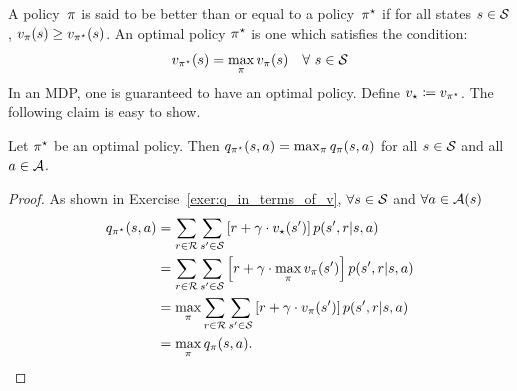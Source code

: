 A policy~$\pi$ is said to be better than or equal to a policy~$\pi^{\star}$
if for all states $s \in \mathcal{S}$, $v_{\pi}(s) \geq v_{\pi^{\star}}(s)$. 
An optimal policy $\pi^{\star}$ is one which satisfies the condition:
\begin{equation}
    v_{\pi^{\star}} (s) = \max_{\pi} v_{\pi} (s) \quad \forall \ s \in \mathcal{S}
\end{equation}
In an MDP, one is guaranteed to have an optimal policy. Define 
$v_{\star} \coloneqq v_{\pi^{\star}}$. The following claim is easy to show.
\begin{lemma}
Let $\pi^{\star}$ be an optimal policy. Then 
$q_{\pi^{\star}}(s, a) = \max_{\pi} q_{\pi} (s, a)$ for all $s \in \mathcal{S}$
and all $a \in \mathcal{A}$.
\end{lemma} 
\begin{proof}
As shown in Exercise~\ref{exer:q_in_terms_of_v}, $\forall s \in \mathcal{S}$ and 
$\forall a \in \mathcal{A} (s)$
\begin{align*}
    q_{\pi^{\star}}(s, a) 
        & = \sum_{r \in \mathcal{R}} \sum_{s' \in \mathcal{S}} \left [ r + \gamma \cdot v_{\star}(s') \right ] p(s', r \vert s, a) \\
        & = \sum_{r \in \mathcal{R}} \sum_{s' \in \mathcal{S}} \left 
                [ r + \gamma \cdot \max_{\pi} v_{\pi}(s') \right ] p(s', r \vert s, a) \\
        & = \max_{\pi} \sum_{r \in \mathcal{R}} \sum_{s' \in \mathcal{S}} \left [ r + \gamma \cdot v_{\pi}(s') \right ] p(s', r \vert s, a) \\       
        & = \max_{\pi} q_{\pi} (s, a).
\end{align*}
\end{proof}


